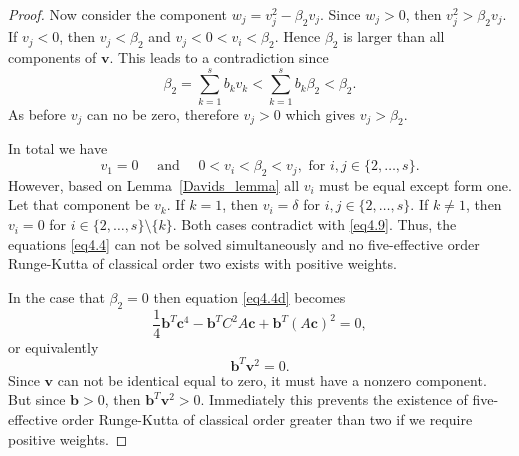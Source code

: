\begin{proof}
    Now consider the component \( w_{j} = v_{j}^{2} - \beta_{2}v_{j} \). Since \( w_{j} > 0 \), then \( v_{j}^{2} > \beta_{2}v_{j} \). If \( v_{j} < 0 \), then \( v_{j} < \beta_{2} \) and \( v_{j} < 0 < v_{i} < \beta_{2} \). Hence \( \beta_{2} \) is larger than all components of \( \bm{v} \). This leads to a contradiction since
    \begin{equation*}
            \beta_{2} = \sum_{k=1}^{s}b_{k}v_{k} < \sum_{k=1}^{s}b_{k}\beta_{2} < \beta_{2}.
    \end{equation*}
    As before \( v_{j} \) can no be zero, therefore \( v_{j} > 0 \) which gives \( v_{j} > \beta_{2} \).

    In total we have
    \begin{equation}\label{eq4.9}
        v_{1} = 0 \quad \text{ and } \quad 0 < v_{i} < \beta_{2} < v_{j}, \text{ for } i,j \in \{2,\dots,s\}.
    \end{equation}
    However, based on Lemma~\ref{Davids_lemma} all \( v_{i} \) must be equal except form one. Let that component be \( v_{k} \). If \( k = 1 \), then \( v_{i} = \delta \) for \( i,j \in \{2,\dots,s\} \). If \( k \neq 1 \), then \( v_{i} = 0 \) for \( i \in \{2,\dots,s\}\setminus\{k\} \). Both cases contradict with \eqref{eq4.9}. Thus, the equations \eqref{eq4.4} can not be solved simultaneously and no five-effective order Runge-Kutta of classical order two exists with positive weights.
    \newline

    In the case that \( \beta_{2} = 0 \) then equation \eqref{eq4.4d} becomes
    \begin{equation*}
        \frac{1}{4}\bm{b}^{T}\bm{c}^{4} - \bm{b}^{T}C^{2}A\bm{c} + \bm{b}^{T}(A\bm{c})^{2} = 0,
    \end{equation*}
    or equivalently
    \begin{equation*}
        \bm{b}^{T}\bm{v}^{2} = 0.
    \end{equation*}
    Since \( \bm{v} \) can not be identical equal to zero, it must have a nonzero component. But since \( \bm{b} > 0 \), then \( \bm{b}^{T}\bm{v}^{2} > 0 \). Immediately this prevents the existence of five-effective order Runge-Kutta of classical order greater than two if we require positive weights.
\end{proof}
